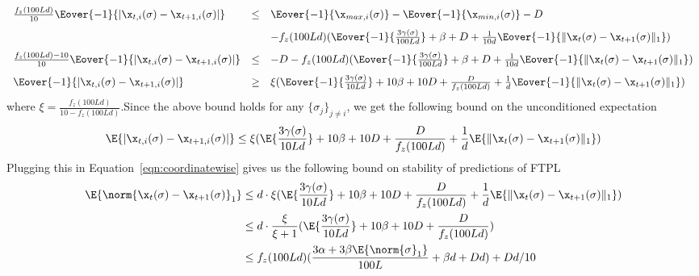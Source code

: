 \begin{equation*}
    \begin{array}{lll}
    \frac{f_z(100Ld)}{10} \Eover{-1}{|\x_{t,i}(\sigma) - \x_{t+1,i}(\sigma)|} &\leq&  \Eover{-1}{\x_{max, i}(\sigma)} - \Eover{-1}{\x_{min, i}(\sigma)}  - D \vspace{0.1in}\\
    && - f_z(100Ld)( \Eover{-1}{\frac{3\gamma(\sigma)}{100Ld}} + \beta + D + \frac{1}{10d}\Eover{-1}{\|\x_{t}(\sigma) - \x_{t+1}(\sigma)\|_1}) \vspace{0.1in}\\
    
    \frac{f_z(100Ld) - 10}{10} \Eover{-1}{|\x_{t,i}(\sigma) - \x_{t+1,i}(\sigma)|} &\leq& - D - f_z(100Ld)( \Eover{-1}{\frac{3\gamma(\sigma)}{100Ld}} + \beta + D + \frac{1}{10d}\Eover{-1}{\|\x_{t}(\sigma) - \x_{t+1}(\sigma)\|_1}) \vspace{0.1in}\\

    \Eover{-1}{|\x_{t,i}(\sigma) - \x_{t+1,i}(\sigma)|} &\geq& \xi ( \Eover{-1}{\frac{3\gamma(\sigma)}{10Ld}} + 10\beta + 10D + \frac{D}{f_z(100Ld)} + \frac{1}{d}\Eover{-1}{\|\x_{t}(\sigma) - \x_{t+1}(\sigma)\|_1}) \\
\end{array}
\end{equation*}
where $\xi = \frac{f_z(100Ld)}{10 - f_z(100Ld)}$.Since the above bound holds for any $\{\sigma_j\}_{j\neq i}$, we get the following bound on the unconditioned expectation
\begin{align*}
\E{|\x_{t,i}(\sigma) - \x_{t+1,i}(\sigma)|}  \leq \xi ( \E{\frac{3\gamma(\sigma)}{10Ld}} + 10\beta + 10D + \frac{D}{f_z(100Ld)} + \frac{1}{d}\E{\|\x_{t}(\sigma) - \x_{t+1}(\sigma)\|_1})
\end{align*}
Plugging this in Equation~\eqref{eqn:coordinatewise} gives us the following bound on stability of predictions of FTPL
\begin{align*}
\E{\norm{\x_{t}(\sigma) - \x_{t+1}(\sigma)}_1} & \leq  d \cdot \xi ( \E{\frac{3\gamma(\sigma)}{10Ld}} + 10\beta + 10D + \frac{D}{f_z(100Ld)} + \frac{1}{d}\E{\|\x_{t}(\sigma) - \x_{t+1}(\sigma)\|_1})\\
& \leq d \cdot \frac{\xi}{\xi + 1} ( \E{\frac{3\gamma(\sigma)}{10Ld}} + 10\beta + 10D + \frac{D}{f_z(100Ld)})\\
& \leq f_z(100Ld)( \frac{3\alpha + 3\beta\E{\norm{\sigma}_1} }{100L} + \beta d + Dd) + Dd/10
\end{align*}

